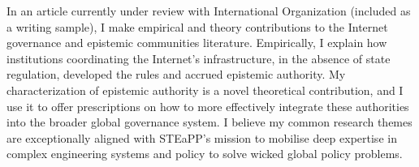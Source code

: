\documentclass[11pt]{letter}
\begin{document}
\begin{letter}
%
%
%
In an article currently under review with International Organization (included as a writing sample), I make empirical and theory contributions to the Internet governance and epistemic communities literature.
%
Empirically, I explain how institutions coordinating the Internet's infrastructure, in the absence of state regulation, developed the rules and accrued epistemic authority.
%
My characterization of epistemic authority is a novel theoretical contribution, and I use it to offer prescriptions on how to more effectively integrate these authorities into the broader global governance system. 
%
%
I believe my common research themes are exceptionally aligned with STEaPP's mission to mobilise deep expertise in complex engineering systems and policy to solve wicked global policy problems.


\end{letter}
\end{document}
